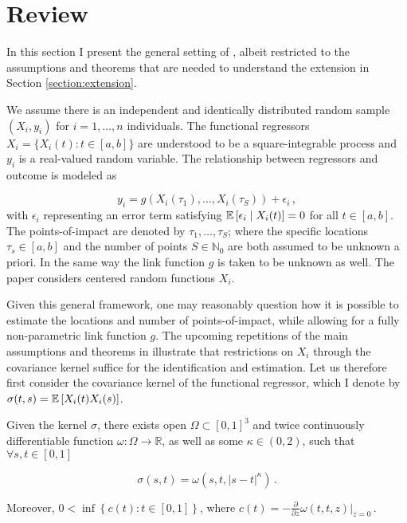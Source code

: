 \section{Review}
\label{section:review}

In this section I present the general setting of \cite{Kneip2020}, albeit restricted to
the assumptions and theorems that are needed to understand the extension in Section
\ref{section:extension}.

We assume there is an independent and identically distributed random sample $(X_i, y_i)$
for $i=1,\dots,n$ individuals. The functional regressors $X_i = \{ X_i(t) : t \in [a, b]
\}$ are understood to be a square-integrable process and $y_i$ is a real-valued random
variable. The relationship between regressors and outcome is modeled as

\[
    y_i = g \left( X_i(\tau_1), \dots, X_i(\tau_S) \right) + \epsilon_i \,,
\]
with $\epsilon_i$ representing an error term satisfying $\mathbb{E}\left[\epsilon_i \mid
X_i(t)\right] = 0$ for all $t \in [a, b]$. The points-of-impact are denoted by $\tau_1, \dots,
\tau_S$; where the specific locations $\tau_s \in [a, b]$ and the number of points $S
\in \mathbb{N}_0$ are both assumed to be unknown a priori. In the same way the link
function $g$ is taken to be unknown as well. The paper considers centered random
functions $X_i$.

Given this general framework, one may reasonably question how it is possible to estimate
the locations and number of points-of-impact, while allowing for a fully non-parametric
link function $g$. The upcoming repetitions of the main assumptions and theorems in
\cite{Kneip2020} illustrate that restrictions on $X_i$ through the covariance kernel
suffice for the identification and estimation. Let us therefore first consider the
covariance kernel of the functional regressor, which I denote by $\sigma(t, s) =
\mathbb{E}\left[X_i(t) X_i(s)\right]$.


\begin{assumption}
    Given the kernel $\sigma$, there exists open $\Omega \subset [0, 1]^3$ and twice
    continuously differentiable function $\omega : \Omega \to \mathbb{R}$, as well as
    some $\kappa \in (0, 2)$, such that $\forall s, t \in [0, 1]$

    \[
        \sigma(s, t) = \omega(s, t, |s-t|^{\kappa}) \,.
    \]

    Moreover, $0 < \inf \left\{ c(t) : t \in [0, 1] \right\}$, where $c(t) =
    -\frac{\partial}{\partial z} \omega(t, t, z)|_{z = 0} \,.$
\label{assumption:1}
\end{assumption}

